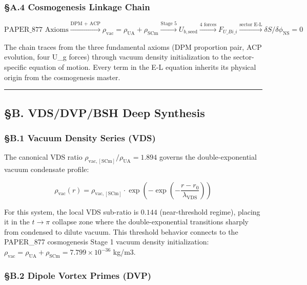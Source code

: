 \documentclass[
  11pt,
]{article}
\begin{document}
\subsubsection{§A.4 Cosmogenesis Linkage
Chain}\label{a.4-cosmogenesis-linkage-chain}

\[\text{PAPER\_877 Axioms} \xrightarrow{\text{DPM + ACP}} \rho_{\mathrm{vac}} = \rho_{\mathrm{UA}} + \rho_{\mathrm{SCm}} \xrightarrow{\text{Stage 5}} U_{b,\mathrm{seed}} \xrightarrow{\text{4 forces}} F_{U\_Bi\_i} \xrightarrow{\text{sector E-L}} \delta S/\delta \phi_{\mathrm{NS}} = 0\]

The chain traces from the three fundamental axioms (DPM proportion pair,
ACP evolution, four U\_g forces) through vacuum density initialization
to the sector-specific equation of motion. Every term in the E-L
equation inherits its physical origin from the cosmogenesis master.

\begin{center}\rule{0.5\linewidth}{0.5pt}\end{center}

\subsection{§B. VDS/DVP/BSH Deep
Synthesis}\label{b.-vdsdvpbsh-deep-synthesis}

\subsubsection{§B.1 Vacuum Density Series
(VDS)}\label{b.1-vacuum-density-series-vds}

The canonical VDS ratio
$\rho_{\mathrm{vac,[SCm]}} / \rho_{\mathrm{UA}} = 1.894$ governs the
double-exponential vacuum condensate profile:

\[\rho_{\mathrm{vac}}(r) = \rho_{\mathrm{vac,[SCm]}} \cdot \exp\!\left(-\exp\!\left(-\frac{r - r_0}{\lambda_{\mathrm{VDS}}}\right)\right)\]

For this system, the local VDS sub-ratio is $0.144$ (near-threshold
regime), placing it in the $t \to \pi$ collapse zone where the
double-exponential transitions sharply from condensed to dilute vacuum.
This threshold behavior connects to the PAPER\_877 cosmogenesis Stage 1
vacuum density initialization:
$\rho_{\mathrm{vac}} = \rho_{\mathrm{UA}} + \rho_{\mathrm{SCm}} = 7.799 \times 10^{-36}$
kg/m3.

\subsubsection{§B.2 Dipole Vortex Primes
(DVP)}\label{b.2-dipole-vortex-primes-dvp}
\end{document}
